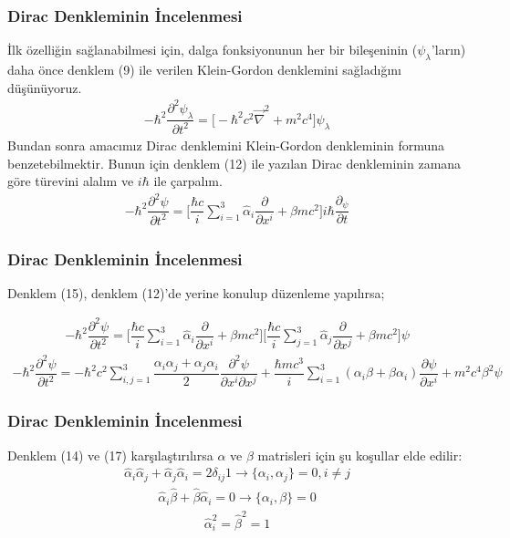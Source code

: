 \documentclass[aspectratio=169,10pt]{beamer}
\begin{document}
	\begin{frame}[allowframebreaks]
\frametitle{Dirac Denkleminin İncelenmesi}

İlk özelliğin sağlanabilmesi için, dalga fonksiyonunun her bir bileşeninin ($\psi_{\lambda}$'ların) daha önce denklem (9) ile verilen Klein-Gordon denklemini sağladığını düşünüyoruz.
\begin{align}
    -\hbar^{2} \dfrac{\partial^{2} \psi_{\lambda} }{\partial t^{2}} = \bigg[ -\hbar^{2} c^{2} \Vec{\nabla}^{2}  + m^{2}c^{4} \bigg]\psi_{\lambda}
\end{align}
Bundan sonra amacımız Dirac denklemini Klein-Gordon denkleminin formuna benzetebilmektir. Bunun için denklem (12) ile yazılan Dirac denkleminin zamana göre türevini alalım ve $i \hbar$ ile çarpalım.
\begin{align}
    -\hbar^{2} \dfrac{\partial^{2} \psi}{\partial t^{2}} = \bigg[  \dfrac{\hbar c}{i} \sum_{i=1}^{3} \hat{\alpha}_{i} \dfrac{\partial}{\partial x^{i}} + \beta mc^{2} \bigg] i \hbar \dfrac{\partial_{\psi}}{\partial t}
\end{align}

\end{frame}


	\begin{frame}[allowframebreaks]
\frametitle{Dirac Denkleminin İncelenmesi}
Denklem (15), denklem (12)'de yerine konulup düzenleme yapılırsa;
	
	\begin{align}
	    -\hbar^{2} \dfrac{\partial^{2} \psi}{\partial t^{2}} = \bigg[  \dfrac{\hbar c}{i} \sum_{i=1}^{3} \hat{\alpha}_{i} \dfrac{\partial}{\partial x^{i}} + \beta mc^{2} \bigg] \bigg[  \dfrac{\hbar c}{i} \sum_{j=1}^{3} \hat{\alpha}_{j} \dfrac{\partial}{\partial x^{j}} + \beta mc^{2} \bigg] \psi
	\end{align}
	\begin{align}
	    -\hbar^{2} \dfrac{\partial^{2} \psi}{\partial t^{2}} = -\hbar^{2} c^{2} \sum_{i,j=1}^{3} \dfrac{\alpha_{i}\alpha_{j} + \alpha_{j}\alpha_{i}}{2} \dfrac{\partial^{2} \psi}{\partial x^{i} \partial x^{j}} + \dfrac{\hbar m c^{3}}{i} \sum_{i=1}^{3} (\alpha_{i} \beta + \beta \alpha_{i}) \dfrac{\partial \psi}{\partial x^{i}} + m^{2} c^{4} \beta^{2} \psi
	\end{align}
\end{frame}

	\begin{frame}[allowframebreaks]
\frametitle{Dirac Denkleminin İncelenmesi}
Denklem (14) ve (17) karşılaştırılırsa $\alpha$ ve $ \beta$ matrisleri için şu koşullar elde edilir: \\
\begin{align}
 \hat{\alpha}_{i} \hat{\alpha}_{j} + \hat{\alpha}_{j}\hat{\alpha}_{i} = 2 \delta_{ij} 1 \rightarrow \{ \alpha_{i} ,\alpha_{j} \} = 0, i \neq j
\end{align}
\begin{align}
 \hat{\alpha}_{i} \hat{\beta} + \hat{\beta}\hat{\alpha}_{i} = 0 \rightarrow \{ \alpha_{i} ,\beta \} = 0
\end{align}
\begin{align}
 \hat{\alpha}_{i}^{2} = \hat{\beta}^{2}  = 1
\end{align}
\end{frame}
\end{document}
